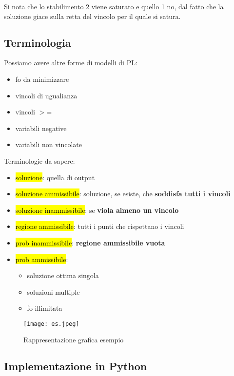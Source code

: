 Si nota che lo stabilimento 2 viene saturato e quello 1 no, dal fatto che la soluzione giace sulla retta del vincolo per il quale si satura.


\subsection{Terminologia}

Possiamo avere altre forme di modelli di PL:

\begin{itemize}
	\item fo da minimizzare
	\item vincoli di ugualianza
	\item vincoli $>$=
	\item variabili negative
	\item variabili non vincolate
\end{itemize}


Terminologie da sapere:

\begin{itemize}
	\item \hl{soluzione}: quella di output
	\item \hl{soluzione ammissibile}: soluzione, se esiste, che \textbf{soddisfa tutti i vincoli}
	\item \hl{soluzione inammissibile}: se \textbf{viola almeno un vincolo} 
	\item \hl{regione ammissibile}: tutti i punti che rispettano i vincoli
	\item \hl{prob inammissibile}: \textbf{regione ammissibile vuota}
	\item \hl{prob ammissibile}:
		\begin{itemize}
			\item soluzione ottima singola
			\item soluzioni multiple
			\item fo illimitata
		\end{itemize}
\end{itemize}


\begin{figure}[H]
\centering
\texttt{[image: es.jpeg]}
\caption{Rappresentazione grafica esempio} 
\label{rge}
\end{figure}

	
	
\subsection{Implementazione in Python}

